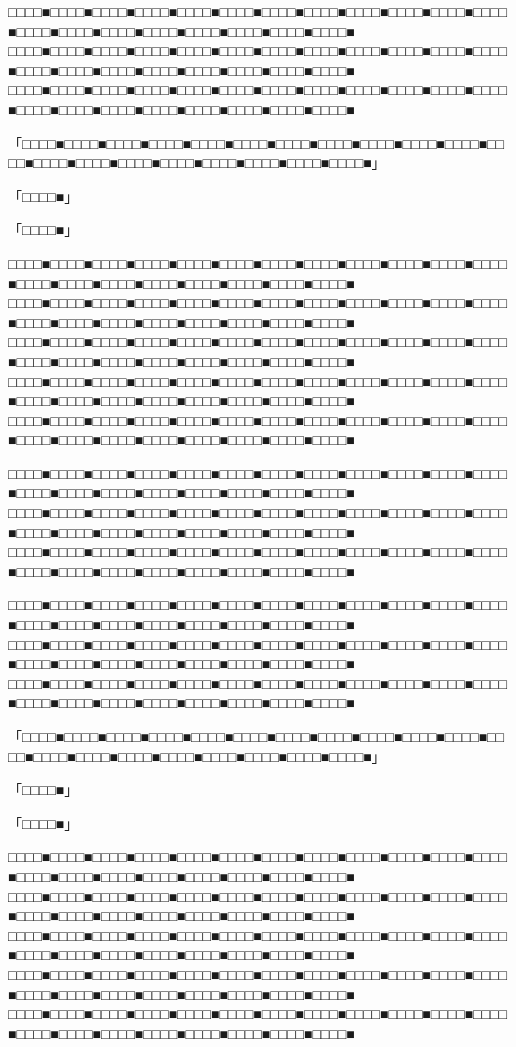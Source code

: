 \documentclass[
tate,
book,
openany,
paper={202mm,270mm},
oneside,
fontsize=9pt, %
jafontsize=9pt, %
head_space=11truemm, %
gutter=8truemm, %
line_length=78zw, %
number_of_lines=35, %
column_gap=5truemm,%
headfoot_verticalposition=4truemm,%
draft
]{jlreq}
\begin{document}
\begin{multicols*}{3}
□□□□■□□□□■□□□□■□□□□■□□□□■□□□□■□□□□■□□□□■□□□□■□□□□■□□□□■□□□□■□□□□■□□□□■□□□□■□□□□■□□□□■□□□□■□□□□■□□□□■
□□□□■□□□□■□□□□■□□□□■□□□□■□□□□■□□□□■□□□□■□□□□■□□□□■□□□□■□□□□■□□□□■□□□□■□□□□■□□□□■□□□□■□□□□■□□□□■□□□□■
□□□□■□□□□■□□□□■□□□□■□□□□■□□□□■□□□□■□□□□■□□□□■□□□□■□□□□■□□□□■□□□□■□□□□■□□□□■□□□□■□□□□■□□□□■□□□□■□□□□■

「□□□□■□□□□■□□□□■□□□□■□□□□■□□□□■□□□□■□□□□■□□□□■□□□□■□□□□■□□□□■□□□□■□□□□■□□□□■□□□□■□□□□■□□□□■□□□□■□□□□■」

「□□□□■」

「□□□□■」

□□□□■□□□□■□□□□■□□□□■□□□□■□□□□■□□□□■□□□□■□□□□■□□□□■□□□□■□□□□■□□□□■□□□□■□□□□■□□□□■□□□□■□□□□■□□□□■□□□□■
□□□□■□□□□■□□□□■□□□□■□□□□■□□□□■□□□□■□□□□■□□□□■□□□□■□□□□■□□□□■□□□□■□□□□■□□□□■□□□□■□□□□■□□□□■□□□□■□□□□■
□□□□■□□□□■□□□□■□□□□■□□□□■□□□□■□□□□■□□□□■□□□□■□□□□■□□□□■□□□□■□□□□■□□□□■□□□□■□□□□■□□□□■□□□□■□□□□■□□□□■
□□□□■□□□□■□□□□■□□□□■□□□□■□□□□■□□□□■□□□□■□□□□■□□□□■□□□□■□□□□■□□□□■□□□□■□□□□■□□□□■□□□□■□□□□■□□□□■□□□□■
□□□□■□□□□■□□□□■□□□□■□□□□■□□□□■□□□□■□□□□■□□□□■□□□□■□□□□■□□□□■□□□□■□□□□■□□□□■□□□□■□□□□■□□□□■□□□□■□□□□■

□□□□■□□□□■□□□□■□□□□■□□□□■□□□□■□□□□■□□□□■□□□□■□□□□■□□□□■□□□□■□□□□■□□□□■□□□□■□□□□■□□□□■□□□□■□□□□■□□□□■
□□□□■□□□□■□□□□■□□□□■□□□□■□□□□■□□□□■□□□□■□□□□■□□□□■□□□□■□□□□■□□□□■□□□□■□□□□■□□□□■□□□□■□□□□■□□□□■□□□□■
□□□□■□□□□■□□□□■□□□□■□□□□■□□□□■□□□□■□□□□■□□□□■□□□□■□□□□■□□□□■□□□□■□□□□■□□□□■□□□□■□□□□■□□□□■□□□□■□□□□■

□□□□■□□□□■□□□□■□□□□■□□□□■□□□□■□□□□■□□□□■□□□□■□□□□■□□□□■□□□□■□□□□■□□□□■□□□□■□□□□■□□□□■□□□□■□□□□■□□□□■
□□□□■□□□□■□□□□■□□□□■□□□□■□□□□■□□□□■□□□□■□□□□■□□□□■□□□□■□□□□■□□□□■□□□□■□□□□■□□□□■□□□□■□□□□■□□□□■□□□□■
□□□□■□□□□■□□□□■□□□□■□□□□■□□□□■□□□□■□□□□■□□□□■□□□□■□□□□■□□□□■□□□□■□□□□■□□□□■□□□□■□□□□■□□□□■□□□□■□□□□■

「□□□□■□□□□■□□□□■□□□□■□□□□■□□□□■□□□□■□□□□■□□□□■□□□□■□□□□■□□□□■□□□□■□□□□■□□□□■□□□□■□□□□■□□□□■□□□□■□□□□■」

「□□□□■」

「□□□□■」

□□□□■□□□□■□□□□■□□□□■□□□□■□□□□■□□□□■□□□□■□□□□■□□□□■□□□□■□□□□■□□□□■□□□□■□□□□■□□□□■□□□□■□□□□■□□□□■□□□□■
□□□□■□□□□■□□□□■□□□□■□□□□■□□□□■□□□□■□□□□■□□□□■□□□□■□□□□■□□□□■□□□□■□□□□■□□□□■□□□□■□□□□■□□□□■□□□□■□□□□■
□□□□■□□□□■□□□□■□□□□■□□□□■□□□□■□□□□■□□□□■□□□□■□□□□■□□□□■□□□□■□□□□■□□□□■□□□□■□□□□■□□□□■□□□□■□□□□■□□□□■
□□□□■□□□□■□□□□■□□□□■□□□□■□□□□■□□□□■□□□□■□□□□■□□□□■□□□□■□□□□■□□□□■□□□□■□□□□■□□□□■□□□□■□□□□■□□□□■□□□□■
□□□□■□□□□■□□□□■□□□□■□□□□■□□□□■□□□□■□□□□■□□□□■□□□□■□□□□■□□□□■□□□□■□□□□■□□□□■□□□□■□□□□■□□□□■□□□□■□□□□■


\end{multicols*}
\end{document}
